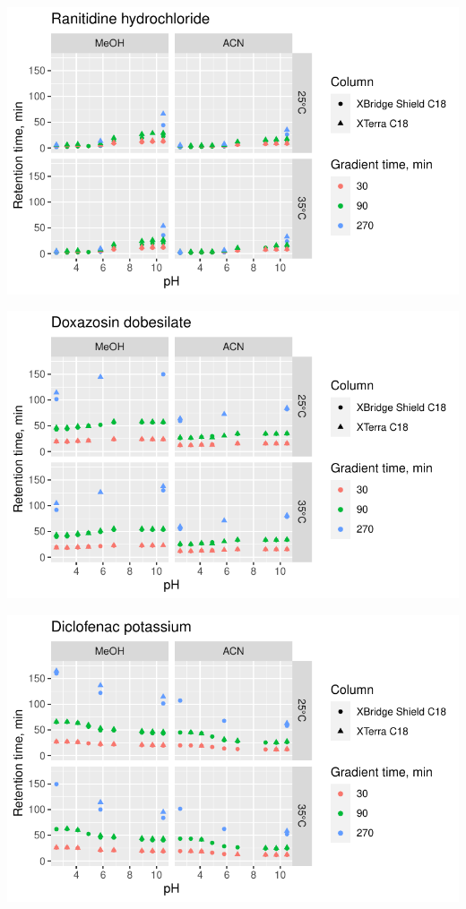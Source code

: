 \documentclass[
  letterpaper,
  DIV=11,
  numbers=noendperiod]{scrreprt}
\begin{document}
\includegraphics{index_files/figure-pdf/unnamed-chunk-4-63.pdf}

\includegraphics{index_files/figure-pdf/unnamed-chunk-4-64.pdf}

\includegraphics{index_files/figure-pdf/unnamed-chunk-4-65.pdf}
\end{document}

